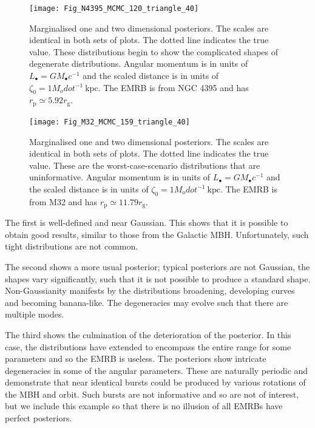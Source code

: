 \documentclass[useAMS,usedcolumn,usegraphicx,usenatbib]{mn2e}
\newcommand{\units}[1]{\ensuremath{~\mathrm{#1}}}
\newcommand{\sub}[1]{\ensuremath{_\mathrm{#1}}}
\begin{document}
\begin{figure}
\begin{center}
   \texttt{[image: Fig\_N4395\_MCMC\_120\_triangle\_40]}
\caption{Marginalised one and two dimensional posteriors. The scales are identical in both sets of plots. The dotted line indicates the true value. These distributions begin to show the complicated shapes of degenerate distributions. Angular momentum is in units of $L_\bullet = GM_\bullet c^{-1}$ and the scaled distance is in units of $\zeta_0 = 1 M_odot^{-1}\units{kpc}$. The EMRB is from NGC 4395 and has $r\sub{p} \simeq 5.92 r\sub{g}$.\label{fig:MCMC-b}}
\end{center}
\end{figure}

\begin{figure}
\begin{center}
   \texttt{[image: Fig\_M32\_MCMC\_159\_triangle\_40]}
\caption{Marginalised one and two dimensional posteriors. The scales are identical in both sets of plots. The dotted line indicates the true value. These are the worst-case-scenario distributions that are uninformative. Angular momentum is in units of $L_\bullet = GM_\bullet c^{-1}$ and the scaled distance is in units of $\zeta_0 = 1 M_odot^{-1}\units{kpc}$. The EMRB is from M32 and has $r\sub{p} \simeq 11.79 r\sub{g}$.}
\label{fig:MCMC-c}
\end{center}
\end{figure}

The first is well-defined and near Gaussian. This shows that it is possible to obtain good results, similar to those from the Galactic MBH. Unfortunately, such tight distributions are not common.

The second shows a more usual posterior; typical posteriors are not Gaussian, the shapes vary significantly, such that it is not possible to produce a standard shape. Non-Gaussianity manifests by the distributions broadening, developing curves and becoming banana-like. The degeneracies may evolve such that there are multiple modes.

The third shows the culmination of the deterioration of the posterior. In this case, the distributions have extended to encompass the entire range for some parameters and so the EMRB is useless. The posteriors show intricate degeneracies in some of the angular parameters. These are naturally periodic and demonstrate that near identical bursts could be produced by various rotations of the MBH and orbit. Such bursts are not informative and so are not of interest, but we include this example so that there is no illusion of all EMRBs have perfect posteriors.
\end{document}
